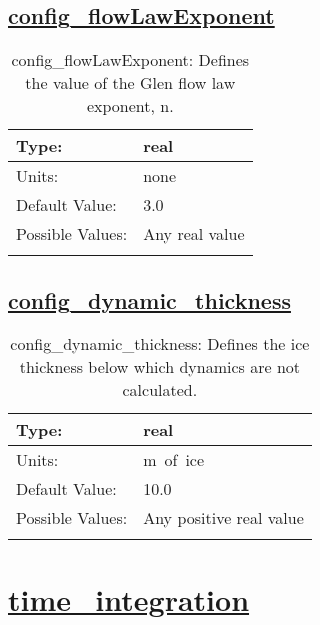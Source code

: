 \subsection[config\_flowLawExponent]{\hyperref[sec:nm_tab_physical_parameters]{config\_flowLawExponent}}
\label{subsec:nm_sec_config_flowLawExponent}
\begin{center}
\begin{longtable}{| p{2.0in} || p{4.0in} |}
    \hline
    Type: & real \\
    \hline
    Units: & \si{none} \\
    \hline
    Default Value: & 3.0 \\
    \hline
    Possible Values: & Any real value \\
    \hline
    \caption{config\_flowLawExponent: Defines the value of the Glen flow law exponent, n.}
\end{longtable}
\end{center}
\subsection[config\_dynamic\_thickness]{\hyperref[sec:nm_tab_physical_parameters]{config\_dynamic\_thickness}}
\label{subsec:nm_sec_config_dynamic_thickness}
\begin{center}
\begin{longtable}{| p{2.0in} || p{4.0in} |}
    \hline
    Type: & real \\
    \hline
    Units: & \si{m.of.ice} \\
    \hline
    Default Value: & 10.0 \\
    \hline
    Possible Values: & Any positive real value \\
    \hline
    \caption{config\_dynamic\_thickness: Defines the ice thickness below which dynamics are not calculated.}
\end{longtable}
\end{center}
\section[time\_integration]{\hyperref[sec:nm_tab_time_integration]{time\_integration}}
\label{sec:nm_sec_time_integration}

